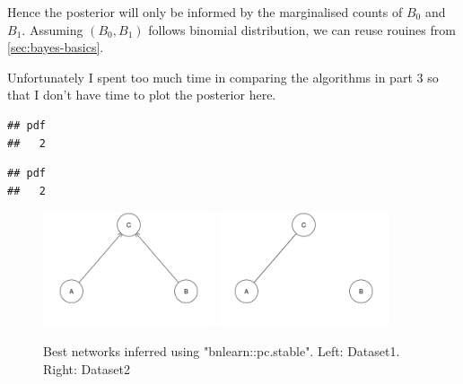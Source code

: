 \documentclass[]{article}
\theoremstyle{definition}
\theoremstyle{definition}
\theoremstyle{definition}
\theoremstyle{remark}
\begin{document}
Hence the posterior will only be informed by the marginalised counts of
\(B_0\) and \(B_1\). Assuming \((B_0,B_1)\) follows binomial
distribution, we can reuse rouines from \ref{sec:bayes-basics}.

Unfortunately I spent too much time in comparing the algorithms in part
3 so that I don't have time to plot the posterior here.

\begin{verbatim}
## pdf 
##   2
\end{verbatim}

\begin{verbatim}
## pdf 
##   2
\end{verbatim}

\begin{figure}
\includegraphics[width=0.45\textwidth]{pcalgo_dat1.png}
\includegraphics[width=0.45\textwidth]{pcalgo_dat2.png}
\caption{ \label{fig:pc-best}Best networks inferred using "bnlearn::pc.stable". Left: Dataset1. Right: Dataset2}
\end{figure}

\end{document}

